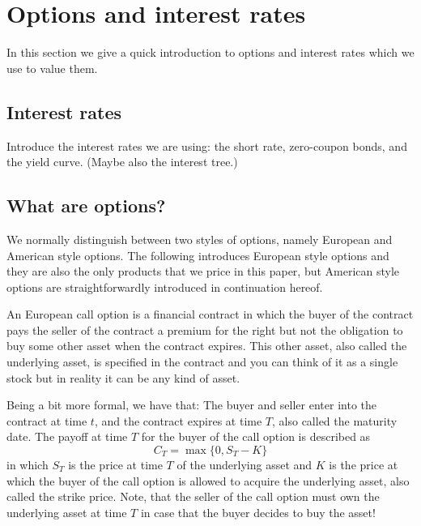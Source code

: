 \section{Options and interest rates}

In this section we give a quick introduction to options and
interest rates which we use to value them.

\subsection{Interest rates}

Introduce the interest rates we are using: the short rate,
zero-coupon bonds, and the yield curve. (Maybe also the
interest tree.)

\subsection{What are options?}

We normally distinguish between two styles of options,
namely European and American style options. The following
introduces European style options and they are also the only
products that we price in this paper, but American style
options are straightforwardly introduced in continuation
hereof.

An European call option is a financial contract in which the
buyer of the contract pays the seller of the contract a
premium for the right but not the obligation to buy some
other asset when the contract expires. This other asset,
also called the underlying asset, is specified in the
contract and you can think of it as a single stock but in
reality it can be any kind of asset.

Being a bit more formal, we have that: The buyer and seller
enter into the contract at time $t$, and the contract
expires at time $T$, also called the maturity date. The
payoff at time $T$ for the buyer of the call option is
described as
%
\begin{equation}
  C_T = \operatorname{max}\{0, S_T-K\}
\end{equation}
%
in which $S_T$ is the price at time $T$ of the underlying
asset and $K$ is the price at which the buyer of the call
option is allowed to acquire the underlying asset, also
called the strike price. Note, that the seller of the call
option must own the underlying asset at time $T$ in case
that the buyer decides to buy the asset!

